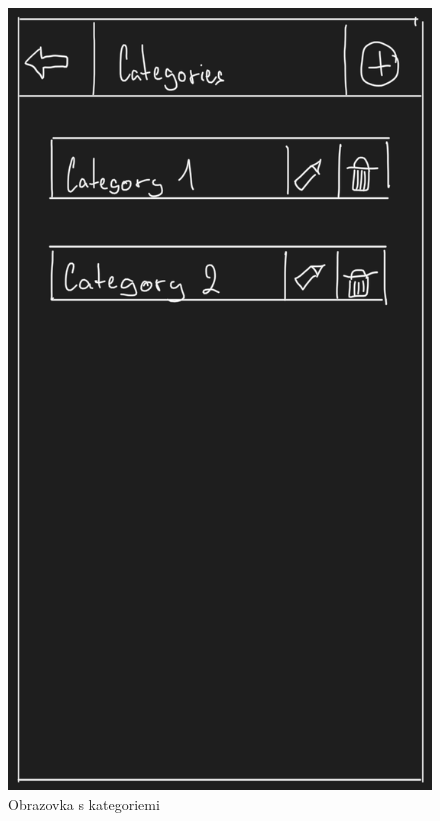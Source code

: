 \documentclass[12pt, titlepage]{article}
\begin{document}
\begin{figure}[ht]
	\centering
	\includegraphics[scale=0.43]{categories_view}
	\caption{Obrazovka s kategoriemi}
	\label{fig:categories_view}
\end{figure}
\end{document}
